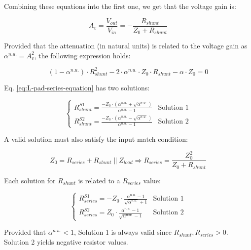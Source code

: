 \noindent Combining these equations into the first one, we get that the voltage gain is:

\begin{equation}
    A_v = \frac{V_{out}}{V_{in}} = -\frac{R_{shunt}}{Z_0 + R_{shunt}}
\end{equation}

\noindent Provided that the attenuation (in natural units) is related to the voltage gain as $\alpha^{n.u.} = A_v^2$, the following expression holds:

\begin{equation}
    (1 - \alpha^{n.u.}) \cdot R_{shunt}^2 - 2 \cdot \alpha^{n.u.} \cdot Z_0 \cdot R_{shunt} - \alpha \cdot Z_0 = 0
    \label{eq:L-pad-series-equation}
\end{equation}

\noindent Eq. \ref{eq:L-pad-series-equation} has two solutions:

\begin{equation}
    \begin{cases}
        R_{shunt}^{S1} = \frac{- Z_0 \cdot (\alpha^{n.u.} + \sqrt{\alpha^{n.u.}})}{\alpha^{n.u.} - 1} & \text{Solution 1} \\
        R_{shunt}^{S2} = \frac{- Z_0 \cdot (\alpha^{n.u.} - \sqrt{\alpha^{n.u.}})}{\alpha^{n.u.} - 1} & \text{Solution 2}
    \end{cases}
\end{equation}

\noindent A valid solution must also satisfy the input match condition:

\begin{equation}
    Z_0 = R_{series} + R_{shunt} \parallel Z_{load} \Rightarrow R_{series} = \frac{Z_0^2}{Z_0 + R_{shunt}}
\end{equation}

\noindent Each solution for $R_{shunt}$ is related to a $R_{series}$ value:

\begin{equation}
    \begin{cases}
        R_{series}^{S1} = -Z_0 \cdot \frac{\alpha^{n.u.} - 1}{\sqrt{\alpha^{n.u.}} + 1}  & \text{Solution 1} \\
        R_{series}^{S2} = Z_0 \cdot \frac{\alpha^{n.u.} - 1}{\sqrt{\alpha^{n.u.}} - 1} & \text{Solution 2}
    \end{cases}
\end{equation}

\noindent Provided that $\alpha^{n.u.} < 1$, Solution 1 is always valid since $R_{shunt}, R_{series} > 0$. Solution 2 yields negative resistor values.

